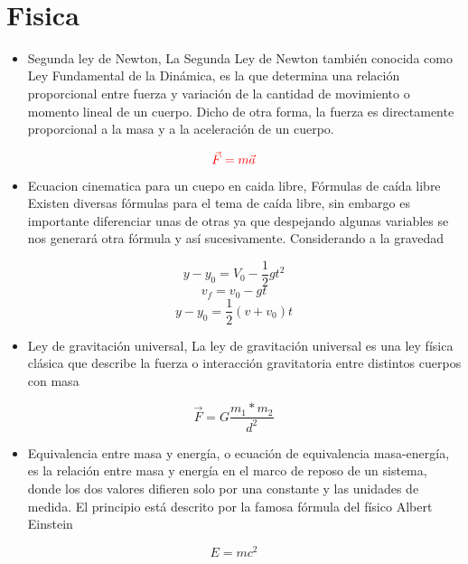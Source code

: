 \documentclass[12pt, letterpaper]{article}
\begin{document}
{\\}



\section{Fisica}

\begin{itemize}
    \item [\star]Segunda ley de Newton, La Segunda Ley de Newton también conocida como Ley Fundamental de la Dinámica, es la que determina una relación proporcional entre fuerza y variación de la cantidad de movimiento o momento lineal de un cuerpo. Dicho de otra forma, la fuerza es directamente proporcional a la masa y a la aceleración de un cuerpo.
\end{itemize}

   $$\textcolor{red}{ \Vec{F} = m\Vec{a} }$$

\begin{itemize}
\item[\bigstar]Ecuacion cinematica para un cuepo en caida libre, Fórmulas de caída libre Existen diversas fórmulas para el tema de caída libre, sin embargo es importante diferenciar unas de otras ya que despejando algunas variables se nos generará otra fórmula y así sucesivamente. Considerando a la gravedad 
\end{itemize}
    $$ y - y_0 = V_0 - \frac{1}{2} g t^2 $$
    $$ v_f = v_0 - g t $$
    $$ y - y_0 = \frac{1}{2} (v + v_0) t $$
\begin{itemize}
\item[\textsection] Ley de gravitación universal, La ley de gravitación universal es una ley física clásica que describe la fuerza o interacción gravitatoria entre distintos cuerpos con masa
\end{itemize}
    $$ \Vec{F} = G \frac{m_1 * m_2}{d^2}$$
\begin{itemize}
\item [ \clubsuit] Equivalencia entre masa y energía, o ecuación de equivalencia masa-energía, es la relación entre masa y energía en el marco de reposo de un sistema, donde los dos valores difieren solo por una constante y las unidades de medida. El principio está descrito por la famosa fórmula del físico Albert Einstein
\end{itemize}
    $$ E = m c^2 $$
    
\end{document}
